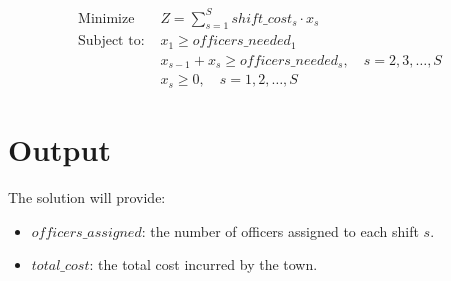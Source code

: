 \documentclass{article}
\begin{document}
\begin{align*}
\text{Minimize } & Z = \sum_{s=1}^{S} shift\_cost_{s} \cdot x_{s} \\
\text{Subject to: } & x_{1} \geq officers\_needed_{1} \\
& x_{s-1} + x_{s} \geq officers\_needed_{s}, \quad s = 2, 3, \ldots, S \\
& x_{s} \geq 0, \quad s = 1, 2, \ldots, S
\end{align*}

\section*{Output}
The solution will provide:
\begin{itemize}
    \item \( officers\_assigned \): the number of officers assigned to each shift \( s \).
    \item \( total\_cost \): the total cost incurred by the town.
\end{itemize}
\end{document}
